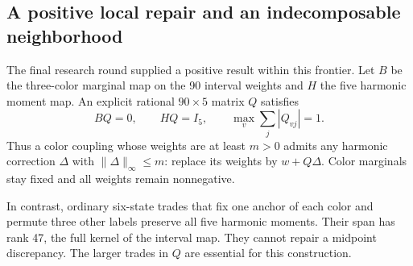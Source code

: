 \subsection{A positive local repair and an indecomposable neighborhood}
The final research round supplied a positive result within this frontier.
Let $B$ be the three-color marginal map on the 90 interval weights and $H$ the five harmonic moment map. An explicit rational $90\times5$ matrix $Q$ satisfies
\[
BQ=0,\qquad HQ=I_5,\qquad
\max_v\sum_j|Q_{vj}|=1.
\]
Thus a color coupling whose weights are at least $m>0$ admits any harmonic correction $\Delta$ with $\|\Delta\|_\infty\le m$: replace its weights by $w+Q\Delta$. Color marginals stay fixed and all weights remain nonnegative.

In contrast, ordinary six-state trades that fix one anchor of each color and permute three other labels preserve all five harmonic moments. Their span has rank 47, the full kernel of the interval map. They cannot repair a midpoint discrepancy. The larger trades in $Q$ are essential for this construction.

